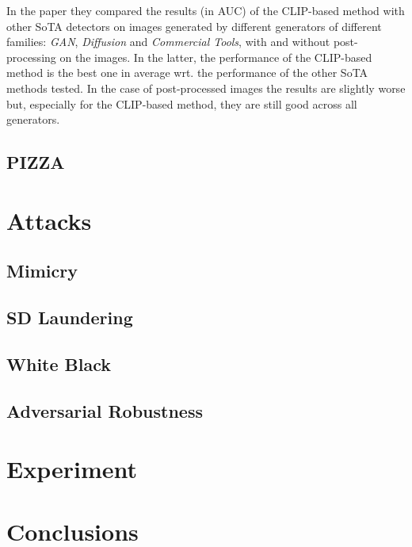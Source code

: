 \documentclass[conference]{IEEEtran} %
\begin{document}
        In the paper they compared the results (in AUC) of the CLIP-based method with other SoTA detectors on images generated by different generators of different families: \textit{GAN}, \textit{Diffusion} and \textit{Commercial Tools}, with and without post-processing on the images. In the latter, the performance of the CLIP-based method is the best one in average wrt. the performance of the other SoTA methods tested. In the case of post-processed images the results are slightly worse but, especially for the CLIP-based method, they are still good across all generators.




    \subsection{PIZZA}
\section{Attacks}
    \subsection{Mimicry}
    \subsection{SD Laundering}
    \subsection{White Black}
    \subsection{Adversarial Robustness}
\section{Experiment}
\section{Conclusions}

\end{document}

